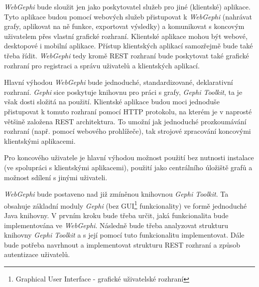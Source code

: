 \documentclass[thesis=M,czech]{FITthesis}[2014/05/6]
\begin{document}
\textit{}\cite{wiki:rest}

\textit{WebGephi} bude sloužit jen jako poskytovatel služeb pro jiné (klientské) aplikace. Tyto aplikace budou pomocí webových služeb přistupovat k \textit{WebGephi} (nahrávat grafy, aplikovat na ně funkce, exportovat výsledky)
a komunikovat s koncovým uživatelem přes vlastní grafické rozhraní. Klientské aplikace mohou být webové, desktopové i mobilní aplikace. Přístup klientských aplikací samozřejmě bude také třeba řídit. 
\textit{WebGephi} tedy kromě REST rozhraní bude poskytovat také grafické rozhraní pro registraci a správu uživatelů a klientských aplikací.

Hlavní výhodou \textit{WebGephi} bude jednoduché, standardizované, deklarativní rozhraní. \textit{Gephi} sice poskytuje knihovnu pro práci s grafy, \textit{Gephi Toolkit}\cite{gephi:toolkit}, ta je však dosti složitá na použití. 
Klientské aplikace budou moci jednoduše přistupovat k tomuto rozhraní pomocí HTTP protokolu, na kterém je v naprosté většině založena REST architektura. To umožní jak
jednoduché prozkoumávání rozhraní (např. pomocí webového prohlížeče), tak strojové zpracování koncovými klientskými aplikacemi.

Pro koncového uživatele je hlavní výhodou možnost použití bez nutnosti instalace (ve spolupráci s klientskými aplikacemi), použití jako centrálního úložiště grafů a možnost sdílení s jinými uživateli.

\textit{WebGephi} bude postaveno nad již zmíněnou knihovnou \textit{Gephi Toolkit}. Ta obsahuje základní moduly \textit{Gephi} (bez GUI\footnote{Graphical User Interface - grafické uživatelské rozhraní} funkcionality) ve formě jednoduché Java knihovny.
V prvním kroku bude třeba určit, jaká funkcionalita bude implementována ve \textit{WebGephi}. Následně bude třeba analyzovat strukturu knihovny \textit{Gephi Toolkit} a s její pomocí tuto funkcionalitu implementovat.
Dále bude potřeba navrhnout a implementovat strukturu REST rozhraní a způsob autentizace uživatelů.
\end{document}
